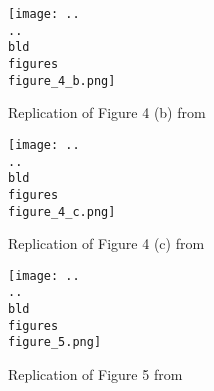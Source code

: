 \documentclass[11pt, a4paper, leqno]{article}
\begin{document}
\begin{figure}[H]
\texttt{[image: ..\\..\\bld\\figures\\figure\_4\_b.png]}
\caption{Replication of Figure 4 (b) from \cite{dellavigna2018motivates}}
\end{figure}

\begin{figure}[H]
\texttt{[image: ..\\..\\bld\\figures\\figure\_4\_c.png]}
\caption{Replication of Figure 4 (c) from \cite{dellavigna2018motivates}}
\end{figure}

\begin{figure}[H]
\texttt{[image: ..\\..\\bld\\figures\\figure\_5.png]}
\caption{Replication of Figure 5 from \cite{dellavigna2018motivates}}
\end{figure}



\printbibliography
{}





\end{document}
